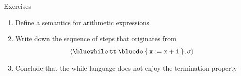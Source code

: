 \documentclass{beamer}
\begin{document}
\begin{frame}{Exercises}

        \begin{enumerate}
                \item Define a semantics for arithmetic expressions

                \item Write down the sequence of steps that originates from
                        \[
                        \pv{\mathtt{{\blue while} \> \prog{tt} \> {\blue do} 
                        \> \{ \> x := x +1 \> \}}}{\sigma}
                        \]
                \item Conclude that the while-language does not enjoy the
                        termination property
        \end{enumerate}
\end{frame}
\end{document}
